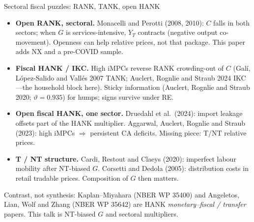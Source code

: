 \documentclass[11pt,aspectratio=169]{beamer}
\begin{document}
\begin{frame}{Sectoral fiscal puzzles: RANK, TANK, open HANK}
  \begin{itemize}
    \item \textbf{Open RANK, sectoral.}
          Monacelli and Perotti (2008, 2010): $C$ falls in both sectors;
          when $G$ is services-intensive, $Y_T$ contracts (negative output
          co-movement). Openness can help relative prices, not that package.
          This paper adds NX and a pre-COVID sample.
    \item \textbf{Fiscal HANK / IKC.}
          High iMPCs reverse RANK crowding-out of $C$ (Gal\'i,
          L\'opez-Salido and Vall\'es 2007 TANK; Auclert, Rognlie and
          Straub 2024 IKC---the household block here). Sticky information
          (Auclert, Rognlie and Straub 2020; $\vartheta=0.935$) for humps;
          signs survive under RE.
    \item \textbf{Open fiscal HANK, one sector.}
          Druedahl et al.\ (2024): import leakage offsets part of the HANK
          multiplier. Aggarwal, Auclert, Rognlie and Straub (2023): high
          iMPCs $\Rightarrow$ persistent CA deficits. Missing piece: T/NT
          relative prices.
    \item \textbf{T / NT structure.}
          Cardi, Restout and Claeys (2020): imperfect labour mobility after
          NT-biased $G$. Corsetti and Dedola (2005): distribution costs in
          retail tradable prices. Composition of $G$ then matters.
  \end{itemize}
  {\scriptsize Contrast, not synthesis: Kaplan--Miyahara (NBER WP 35400) and
  Angeletos, Lian, Wolf and Zhang (NBER WP 35642) are HANK \emph{monetary--fiscal
  / transfer} papers. This talk is NT-biased $G$ and sectoral multipliers.}
\end{frame}
\end{document}
